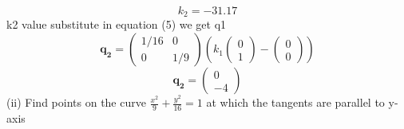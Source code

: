 \documentclass[10pt, a4paper]{article}
\newcommand{\myvec}[1]{\ensuremath{\begin{pmatrix}#1\end{pmatrix}}}
\let\vec\mathbf
\begin{document}
\begin{equation}
k_2=-31.17
\end{equation}
k2 value substitute in equation (5) we get q1\\
\begin{equation}
\vec{q_2}={\myvec{1/16&0\\0&1/9}(k_1\myvec{0\\1}-\myvec{0\\0})}
\end{equation}
\begin{equation}
\vec{q_2}=\myvec{0\\-4}
\end{equation}
	(ii) Find points on the curve $\frac{x^2}{9}+\frac{y^2}{16}=1$ at which the tangents are parallel to y-axis\\
	
\end{document}
